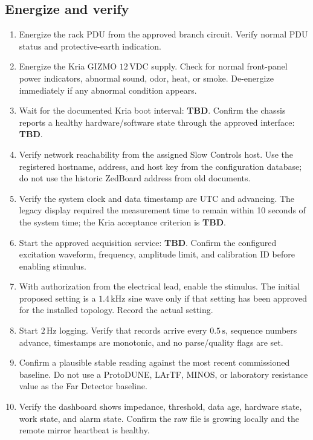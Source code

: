\documentclass[11pt]{article}
\newcommand{\GIZMO}{\textsc{GIZMO}}
\newcommand{\TBD}{\textcolor{dunered}{\textbf{TBD}}}
\begin{document}
\subsection{Energize and verify}

\begin{enumerate}
  \item Energize the rack PDU from the approved branch circuit. Verify normal PDU status and protective-earth indication.
  \item Energize the Kria \GIZMO{} $12\,\mathrm{VDC}$ supply. Check for normal front-panel power indicators, abnormal sound, odor, heat, or smoke. De-energize immediately if any abnormal condition appears.
  \item Wait for the documented Kria boot interval: \TBD. Confirm the chassis reports a healthy hardware/software state through the approved interface: \TBD.
  \item Verify network reachability from the assigned Slow Controls host. Use the registered hostname, address, and host key from the configuration database; do not use the historic ZedBoard address from old documents.
  \item Verify the system clock and data timestamp are UTC and advancing. The legacy display required the measurement time to remain within 10 seconds of the system time; the Kria acceptance criterion is \TBD.
  \item Start the approved acquisition service: \TBD. Confirm the configured excitation waveform, frequency, amplitude limit, and calibration ID before enabling stimulus.
  \item With authorization from the electrical lead, enable the stimulus. The initial proposed setting is a $1.4\,\mathrm{kHz}$ sine wave only if that setting has been approved for the installed topology. Record the actual setting.
  \item Start $2\,\mathrm{Hz}$ logging. Verify that records arrive every $0.5\,\mathrm{s}$, sequence numbers advance, timestamps are monotonic, and no parse/quality flags are set.
  \item Confirm a plausible stable reading against the most recent commissioned baseline. Do not use a ProtoDUNE, LArTF, MINOS, or laboratory resistance value as the Far Detector baseline.
  \item Verify the dashboard shows impedance, threshold, data age, hardware state, work state, and alarm state. Confirm the raw file is growing locally and the remote mirror heartbeat is healthy.
\end{enumerate}
\end{document}

